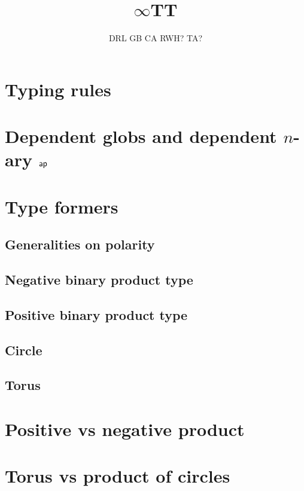 \documentclass[11pt]{article}
\begin{document}
\title{$\infty$TT}
\author{DRL \qquad GB \qquad CA \qquad RWH? \qquad TA?}
\maketitle

\section{Typing rules}


\clearpage
\section{Dependent globs and dependent $n$-ary $\mathsf{ap}$}


\clearpage
\section{Type formers}

\subsection{Generalities on polarity}


\subsection{Negative binary product type}


\subsection{Positive binary product type}


\subsection{Circle}


\subsection{Torus}


\clearpage
\section{Positive vs negative product}


\clearpage
\section{Torus vs product of circles}

\end{document}
